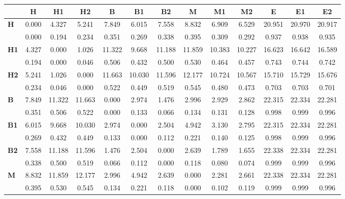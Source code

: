 \begin{table*}[h!]
\begin{center}
\begin{tabular}{| l || c | c | c || c | c | c || c | c | c || c | c | c |}\hline
 & {\bf H} & {\bf H1} & {\bf H2} & {\bf B} & {\bf B1} & {\bf B2} & {\bf M} & {\bf M1} & {\bf M2} & {\bf E} & {\bf E1} & {\bf E2} \\\hline\hline
{\bf H} & 0.000 & 4.327 & 5.241 & 7.849 & 6.015 & 7.558 & 8.832 & 6.909 & 6.529 & 20.951 & 20.970 & 20.917 \\
 & 0.000  & 0.194  & 0.234  & 0.351  & 0.269  & 0.338  & 0.395  & 0.309  & 0.292  & 0.937  & 0.938  & 0.935 \\\hline
{\bf H1} & 4.327 & 0.000 & 1.026 & 11.322 & 9.668 & 11.188 & 11.859 & 10.383 & 10.227 & 16.623 & 16.642 & 16.589 \\
 & 0.194  & 0.000  & 0.046  & 0.506  & 0.432  & 0.500  & 0.530  & 0.464  & 0.457  & 0.743  & 0.744  & 0.742 \\\hline
{\bf H2} & 5.241 & 1.026 & 0.000 & 11.663 & 10.030 & 11.596 & 12.177 & 10.724 & 10.567 & 15.710 & 15.729 & 15.676 \\
 & 0.234  & 0.046  & 0.000  & 0.522  & 0.449  & 0.519  & 0.545  & 0.480  & 0.473  & 0.703  & 0.703  & 0.701 \\\hline\hline
{\bf B} & 7.849 & 11.322 & 11.663 & 0.000 & 2.974 & 1.476 & 2.996 & 2.929 & 2.862 & 22.315 & 22.334 & 22.281 \\
 & 0.351  & 0.506  & 0.522  & 0.000  & 0.133  & 0.066  & 0.134  & 0.131  & 0.128  & 0.998  & 0.999  & 0.996 \\\hline
{\bf B1} & 6.015 & 9.668 & 10.030 & 2.974 & 0.000 & 2.504 & 4.942 & 3.130 & 2.795 & 22.315 & 22.334 & 22.281 \\
 & 0.269  & 0.432  & 0.449  & 0.133  & 0.000  & 0.112  & 0.221  & 0.140  & 0.125  & 0.998  & 0.999  & 0.996 \\\hline
{\bf B2} & 7.558 & 11.188 & 11.596 & 1.476 & 2.504 & 0.000 & 2.639 & 1.789 & 1.655 & 22.338 & 22.334 & 22.281 \\
 & 0.338  & 0.500  & 0.519  & 0.066  & 0.112  & 0.000  & 0.118  & 0.080  & 0.074  & 0.999  & 0.999  & 0.996 \\\hline\hline
{\bf M} & 8.832 & 11.859 & 12.177 & 2.996 & 4.942 & 2.639 & 0.000 & 2.281 & 2.661 & 22.338 & 22.334 & 22.281 \\
 & 0.395  & 0.530  & 0.545  & 0.134  & 0.221  & 0.118  & 0.000  & 0.102  & 0.119  & 0.999  & 0.999  & 0.996 \\\hline

\end{tabular}
\end{center}
\end{table*}
